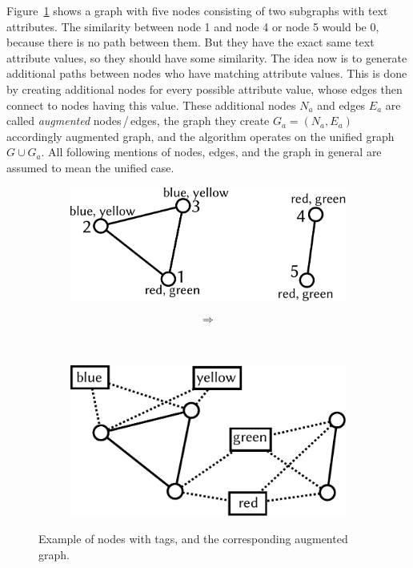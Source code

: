 Figure~\ref{fig:sa} shows a graph with five nodes consisting of two subgraphs with text attributes. The similarity between node 1 and node 4 or node 5 would be $0$, because there is no path between them. But they have the exact same text attribute values, so they should have some similarity. The idea now is to generate additional paths between nodes who have matching attribute values. This is done by creating additional nodes for every possible attribute value, whose edges then connect to nodes having this value. These additional nodes $N_a$ and edges $E_a$ are called \emph{augmented} nodes\,/\,edges, the graph they create $G_a = (N_a, E_a)$ accordingly augmented graph, and the algorithm operates on the unified graph $G \cup G_a$. All following mentions of nodes, edges, and the graph in general are assumed to mean the unified case.
%
\begin{figure}[b]
\centering
	\begin{subfigure}[b]{0.40\textwidth}
		\centering
		\includegraphics[width=\textwidth]{pix/SA1.pdf}
	\end{subfigure}
	\hfill
	\begin{subfigure}[b]{0.05\textwidth}
	\centering	
	$$\Rightarrow$$\\
	\hspace*{\fill} \\
	\hspace*{\fill}
	\end{subfigure}
	\hfill
	\begin{subfigure}[b]{0.40\textwidth}
		\centering
		\includegraphics[width=\textwidth]{pix/SA2.pdf}
	\end{subfigure}
\caption[Transition to the augmented graph.]{Example of nodes with tags, and the corresponding augmented graph.}\label{fig:sa}
\end{figure}
%

